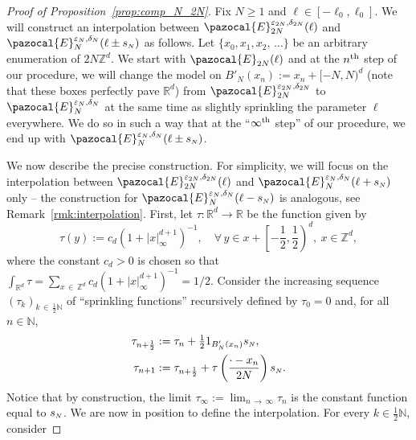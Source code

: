 \documentclass[10pt]{amsart}
\theoremstyle{definition}\newtheorem{defi}[theo]{Definition}\newtheorem{rema}[theo]{Remark}\newtheorem{exam}[theo]{Example}\newtheorem{exem}[theo]{Example}\newtheorem{nota}[theo]{Notation}
\newcommand{\R}{\mathbb{R}}
\newcommand{\Z}{\mathbb{Z}}
\newcommand{\N}{\mathbb{N}}
\newcommand{\si}[1]{{\mathchoice{}{}{\scriptscriptstyle}{}#1}}
\newcommand{\sN}{{\mathchoice{}{}{\scriptscriptstyle}{}N}}
\let\oldforall\forall
\renewcommand*{\forall}{\mathrel{\oldforall}}
\begin{document}
\begin{proof}[Proof of Proposition~\ref{prop:comp_N_2N}] Fix $N\geq1$ and $\ell\in[-\ell_0,\ell_0]$. We will construct an interpolation between $\pazocal{E}_{2N}^{\varepsilon_{\si{2N}}, \delta_{\si{2N}}}(\ell)$ and $\pazocal{E}_{N}^{\varepsilon_{\sN}, \delta_{\sN}}(\ell\pm s_{\sN})$ as follows. Let $\{x_0,x_1,x_2,\,\dots\}$ be an arbitrary enumeration of $2N\Z^d$. We start with $\pazocal{E}_{2N}(\ell)$ and at the $n^{\rm th}$ step of our procedure, we will change the model on $B'_N(x_n):=x_n+[-N,N)^d$ (note that these boxes perfectly pave $\R^d$) from $\pazocal{E}_{2N}^{\varepsilon_{\si{2N}}, \delta_{\si{2N}}}$ to $\pazocal{E}^{\varepsilon_{\sN}, \delta_{\sN}}_{N}$ at the same time as slightly sprinkling the parameter $\ell$ everywhere. We do so in such a way that at the ``$\infty^{\rm th}$ step'' of our procedure, we end up with $\pazocal{E}^{\varepsilon_{\sN}, \delta_{\sN}}_{N}(\ell\pm s_{\sN})$.

We now describe the precise construction. For simplicity, we will focus on the interpolation between $\pazocal{E}_{2N}^{\varepsilon_{\si{2N}}, \delta_{\si{2N}}}(\ell)$ and $\pazocal{E}_{N}^{\varepsilon_{\sN}, \delta_{\sN}}(\ell+s_{\sN})$ only -- the construction for $\pazocal{E}_{N}^{\varepsilon_{\sN}, \delta_{\sN}}(\ell-s_{\sN})$ is analogous, see Remark~\ref{rmk:interpolation}. First, let $\tau:\R^d\to\R$ be the function given by
\begin{equation}\label{eq:tau}
\tau(y):=c_d\left(1+|x|_\infty^{d+1}\right)^{-1},\quad\forall\, y\in x+\left[-\frac12,\frac12\right)^d,~x\in \Z^d,
\end{equation}
where the constant $c_d>0$ is chosen so that $\int_{\R^d} \tau=\sum_{x\,\in\,\Z^d} c_d(1+|x|_\infty^{d+1})^{-1}=1/2$. Consider the increasing sequence $(\tau_k)_{k\,\in\,\frac12 \N}$ of ``sprinkling functions'' recursively defined by $\tau_0=0$ and, for all $n\in\N$,
\begin{align}
\tau_{n+\frac12} &:= \tau_n + \tfrac{1}{2} 1_{B'_{N}(x_n)} s_{\sN},\label{eq:tau_k_1}\\
\tau_{n+1} &:= \tau_{n+\frac12} + \tau\left(\frac{\cdot-x_n}{2N}\right)s_{\sN}.\label{eq:tau_k_2}
\end{align}
Notice that by construction, the limit $\tau_{\infty}:=\lim_{n\,\to\,\infty} \tau_n$ is the constant function equal to $s_{\sN}$. We are now in position to define the interpolation. For every $k\in\frac12\N$, consider


\end{proof}
\end{document}
